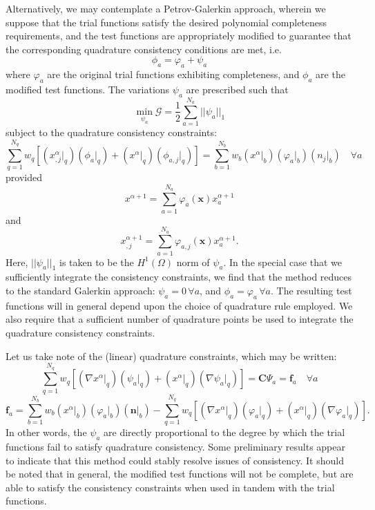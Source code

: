 \documentclass[11pt]{article} %
\begin{document}
Alternatively, we may contemplate a Petrov-Galerkin approach, wherein we suppose that the trial functions satisfy the desired polynomial completeness requirements, and the test functions are appropriately modified to guarantee that the corresponding quadrature consistency conditions are met, i.e.
\begin{equation}
	\phi_a = \varphi_a + \psi_a
\end{equation}
where $\varphi_a$ are the original trial functions exhibiting completeness, and $\phi_a$ are the modified test functions. The variations $\psi_a$ are prescribed such that
\begin{equation}
	\min_{\psi_a} \mathcal{G} = \frac{1}{2} \sum_{a = 1}^{N_a} || \psi_a ||_1
\end{equation}
subject to the quadrature consistency constraints:
\begin{equation}
	\sum_{q=1}^{N_q} w_q \left[ (x^\alpha_{,j} |_q) (\phi_a |_q) + (x^\alpha |_q) (\phi_{a,j} |_q) \right] = \sum_{b=1}^{N_b} w_b (x^\alpha |_b) (\varphi_a |_b) (n_j |_b) \quad \forall a
\end{equation}
provided
\begin{equation}
	x^{\alpha+1} = \sum_{a=1}^{N_a} \varphi_a (\mathbf{x}) x^{\alpha+1}_a
\end{equation}
and
\begin{equation}
	x^{\alpha+1}_{,j} = \sum_{a=1}^{N_a} \varphi_{a,j} (\mathbf{x}) x^{\alpha+1}_a.
\end{equation}
Here, $|| \psi_a ||_1$ is taken to be the $H^1 (\Omega)$ norm of $\psi_a$. In the special case that we sufficiently integrate the consistency constraints, we find that the method reduces to the standard Galerkin approach: $\psi_a = 0 \, \forall a$, and $\phi_a = \varphi_a \, \forall a$. The resulting test functions will in general depend upon the choice of quadrature rule employed. We also require that a sufficient number of quadrature points be used to integrate the quadrature consistency constraints.

Let us take note of the (linear) quadrature constraints, which may be written:
\begin{equation}
	\sum_{q=1}^{N_q} w_q \left[ (\nabla x^\alpha |_q) (\psi_a |_q) + (x^\alpha |_q) (\nabla \psi_a |_q) \right] = \mathbf{C} \Psi_{a} = \mathbf{f}_{a} \quad \forall a
\end{equation}
\begin{equation}
	\mathbf{f}_{a} = \sum_{b=1}^{N_b} w_b (x^\alpha |_b) (\varphi_a |_b) (\mathbf{n} |_b) - \sum_{q=1}^{N_q} w_q \left[ (\nabla x^\alpha |_q) (\varphi_a |_q) + (x^\alpha |_q) (\nabla \varphi_{a} |_q) \right].
\end{equation}
In other words, the $\psi_a$ are directly proportional to the degree by which the trial functions fail to satisfy quadrature consistency. Some preliminary results appear to indicate that this method could stably resolve issues of consistency. It should be noted that in general, the modified test functions will not be complete, but are able to satisfy the consistency constraints when used in tandem with the trial functions.
\end{document}
